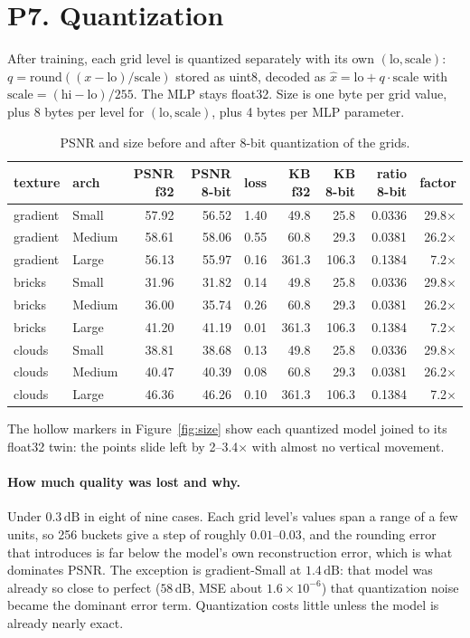 \documentclass[11pt]{article}
\newcommand{\dB}{\,\mathrm{dB}}
\begin{document}
\section*{P7. Quantization}
\label{sec:quant}

After training, each grid level is quantized separately with its own $(\text{lo}, \text{scale})$: $q = \mathrm{round}((x - \text{lo})/\text{scale})$ stored as uint8, decoded as $\hat{x} = \text{lo} + q\cdot\text{scale}$ with $\text{scale} = (\text{hi}-\text{lo})/255$. The MLP stays float32. Size is one byte per grid value, plus 8 bytes per level for $(\text{lo},\text{scale})$, plus 4 bytes per MLP parameter.

\begin{table}[H]
\centering
\small
\begin{tabular}{llrrrrrrr}
\toprule
texture & arch & PSNR f32 & PSNR 8-bit & loss & KB f32 & KB 8-bit & ratio 8-bit & factor \\
\midrule
gradient & Small  & 57.92 & 56.52 & 1.40 & 49.8 & 25.8 & 0.0336 & 29.8$\times$ \\
gradient & Medium & 58.61 & 58.06 & 0.55 & 60.8 & 29.3 & 0.0381 & 26.2$\times$ \\
gradient & Large  & 56.13 & 55.97 & 0.16 & 361.3 & 106.3 & 0.1384 & 7.2$\times$ \\
bricks & Small  & 31.96 & 31.82 & 0.14 & 49.8 & 25.8 & 0.0336 & 29.8$\times$ \\
bricks & Medium & 36.00 & 35.74 & 0.26 & 60.8 & 29.3 & 0.0381 & 26.2$\times$ \\
bricks & Large  & 41.20 & 41.19 & 0.01 & 361.3 & 106.3 & 0.1384 & 7.2$\times$ \\
clouds & Small  & 38.81 & 38.68 & 0.13 & 49.8 & 25.8 & 0.0336 & 29.8$\times$ \\
clouds & Medium & 40.47 & 40.39 & 0.08 & 60.8 & 29.3 & 0.0381 & 26.2$\times$ \\
clouds & Large  & 46.36 & 46.26 & 0.10 & 361.3 & 106.3 & 0.1384 & 7.2$\times$ \\
\bottomrule
\end{tabular}
\caption{PSNR and size before and after 8-bit quantization of the grids.}
\end{table}

The hollow markers in Figure~\ref{fig:size} show each quantized model joined to its float32 twin: the points slide left by 2--3.4$\times$ with almost no vertical movement.

\paragraph{How much quality was lost and why.} Under $0.3\dB$ in eight of nine cases. Each grid level's values span a range of a few units, so 256 buckets give a step of roughly $0.01$--$0.03$, and the rounding error that introduces is far below the model's own reconstruction error, which is what dominates PSNR. The exception is gradient-Small at $1.4\dB$: that model was already so close to perfect ($58\dB$, MSE about $1.6\times10^{-6}$) that quantization noise became the dominant error term. Quantization costs little unless the model is already nearly exact.
\end{document}
